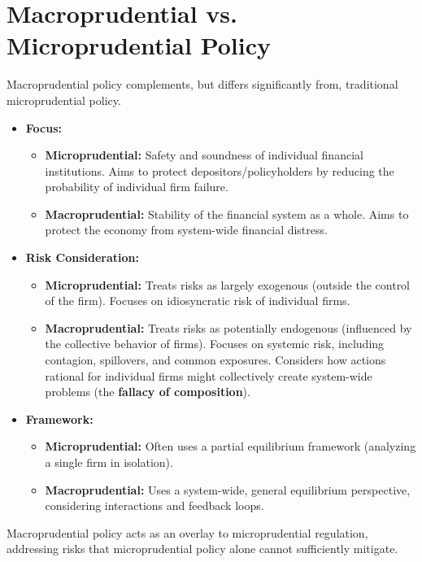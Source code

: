 \section{Macroprudential vs. Microprudential Policy}

Macroprudential policy complements, but differs significantly from, traditional microprudential policy.

\begin{itemize}
    \item \textbf{Focus:}
        \begin{itemize}
            \item \textbf{Microprudential:} Safety and soundness of individual financial institutions. Aims to protect depositors/policyholders by reducing the probability of individual firm failure.
            \item \textbf{Macroprudential:} Stability of the financial system as a whole. Aims to protect the economy from system-wide financial distress.
        \end{itemize}
    \item \textbf{Risk Consideration:}
        \begin{itemize}
            \item \textbf{Microprudential:} Treats risks as largely exogenous (outside the control of the firm). Focuses on idiosyncratic risk of individual firms.
            \item \textbf{Macroprudential:} Treats risks as potentially endogenous (influenced by the collective behavior of firms). Focuses on systemic risk, including contagion, spillovers, and common exposures. Considers how actions rational for individual firms might collectively create system-wide problems (the \textbf{fallacy of composition}).
        \end{itemize}
    \item \textbf{Framework:}
        \begin{itemize}
            \item \textbf{Microprudential:} Often uses a partial equilibrium framework (analyzing a single firm in isolation).
            \item \textbf{Macroprudential:} Uses a system-wide, general equilibrium perspective, considering interactions and feedback loops.
        \end{itemize}
\end{itemize}
Macroprudential policy acts as an overlay to microprudential regulation, addressing risks that microprudential policy alone cannot sufficiently mitigate.


